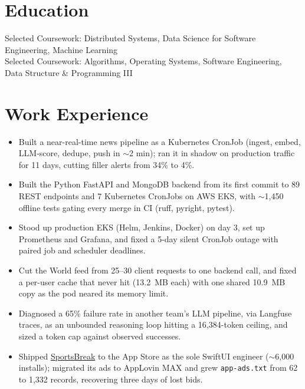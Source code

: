 \documentclass[11pt, letterpaper]{article}
\begin{document}

\section{Education}
Selected Coursework: Distributed Systems, Data Science for Software Engineering, Machine Learning\\[1pt]
Selected Coursework: Algorithms, Operating Systems, Software Engineering, Data Structure \& Programming III

\section{Work Experience}
\begin{itemize}
  \item Built a near-real-time news pipeline as a Kubernetes CronJob (ingest, embed, LLM-score, dedupe, push in $\sim$2 min); ran it in shadow on production traffic for 11 days, cutting filler alerts from 34\% to 4\%.
  \item Built the Python FastAPI and MongoDB backend from its first commit to 89 REST endpoints and 7 Kubernetes CronJobs on AWS EKS, with $\sim$1{,}450 offline tests gating every merge in CI (ruff, pyright, pytest).
  \item Stood up production EKS (Helm, Jenkins, Docker) on day 3, set up Prometheus and Grafana, and fixed a 5-day silent CronJob outage with paired job and scheduler deadlines.
  \item Cut the World feed from 25--30 client requests to one backend call, and fixed a per-user cache that never hit (13.2~MB each) with one shared 10.9~MB copy as the pod neared its memory limit.
  \item Diagnosed a 65\% failure rate in another team's LLM pipeline, via Langfuse traces, as an unbounded reasoning loop hitting a 16{,}384-token ceiling, and sized a token cap against observed successes.
  \item Shipped \href{https://apps.apple.com/app/id6762649287}{SportsBreak} to the App Store as the sole SwiftUI engineer ($\sim$6{,}000 installs); migrated its ads to AppLovin MAX and grew \texttt{app-ads.txt} from 62 to 1{,}332 records, recovering three days of lost bids.
\end{itemize}
\end{document}
